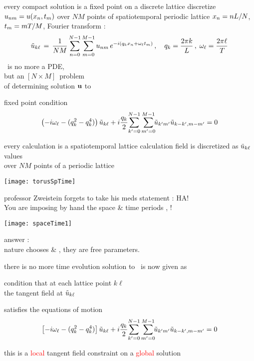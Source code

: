 \begin{frame}{every compact solution is a fixed point on a discrete lattice}
discretize $u_{nm} = u(x_n,t_m)$ over
$N M$ points of spatiotemporal periodic lattice $x_n = n L/N$,
 $t_m = m {T_{}}/M$, Fourier transform :
\[
\tilde{u}_{k\ell} \,=\,
  \frac{1}{NM} \sum^{N-1}_{n=0} \sum^{M-1}_{m=0}
  u_{nm} \, e^{-i(q_kx_n + \omega_\ell t_m)}
    \,,\quad
q_k = \frac{2 \pi k}{L}
    \,,\;
\omega_\ell = \frac{2 \pi \ell}{{T_{}}}
\]
\KS\ is no more a PDE, \\
but an {\color{blue}{algebraic}} $[N\!\times\!M]$\dmn\ problem\\
of determining {\color{blue}{global}} solution ${\bf u}$ to
\begin{block}{fixed point condition}
\[
\left(- i \omega_\ell - ( q_k^2 - q_k^4 ) \right)\tilde{u}_{k\ell}
+ i \frac{q_k}{2} \!\sum_{k'=0}^{N-1} \sum^{M-1}_{m'=0}\!\!
\tilde{u}_{k'm'} \tilde{u}_{k-k',m-m'}
    = 0
\]
\end{block}
\end{frame}

\begin{frame}{every calculation is a spatiotemporal lattice calculation}
field is discretized as
$\tilde{u}_{k\ell}$ values  \\ over
$N M$ points of a periodic lattice


\begin{center}
\texttt{[image: torusSpTime]}
\end{center}
\end{frame}

\begin{frame}{professor Zweistein forgets to take his meds}
\medskip
statement : {\huge HA!} \\
You are imposing by hand the space \& time periods
\speriod{}, \period{} {\huge !}

\begin{center}
\texttt{[image: spaceTime1]}
\end{center}

answer : {\huge\color{red}{NO!}} \\
nature chooses \speriod{} \& \period{},
they are free parameters.
\end{frame}

\begin{frame}{there is no more time evolution}
solution to \KS\ is now given as
\begin{block}{condition that}
at each lattice point $k\ell$ \\
the tangent field at $\tilde{u}_{k\ell}$
\end{block}
satisfies the equations of motion
\[
\left[- i \omega_\ell - ( q_k^2 - q_k^4 ) \right]\tilde{u}_{k\ell}
+ i \frac{q_k}{2} \!\sum_{k'=0}^{N-1} \sum^{M-1}_{m'=0}\!\!
\tilde{u}_{k'm'} \tilde{u}_{k-k',m-m'}
    =
0
\]

\bigskip

this is a \textcolor{red}{local} tangent field constraint on a \textcolor{red}{global} solution
\end{frame}


